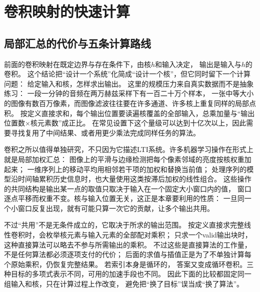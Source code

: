 \section{卷积映射的快速计算}
\label{sec:signal-analysis-fast-transforms}

\subsection{局部汇总的代价与五条计算路线}

前面的卷积映射在既定边界与存在条件下，由核$h$和输入决定，
输出是输入与$h$的卷积。
这个结论把“设计一个系统”化简成“设计一个核”，但它同时留下一个计算问题：
给定输入和核，怎样求出输出。
这里的规模压力来自真实数据而不是抽象练习：
一段一分钟的音频在两万赫兹采样下有一百二十万个样本，
一张中等大小的图像有数百万像素，而图像滤波往往要在许多通道、许多核上重复同样的局部点积。
按定义直接求和，每个输出位置要读遍核覆盖的全部输入，总乘加量与“输出位置数×核元素数”成正比。
在常见设置下这个量级可以达到十亿次以上，因此需要寻找复用了中间结果、或者用更少乘法完成同样任务的算法。

卷积之所以值得单独研究，不只因为它描述LTI系统。许多机器学习操作在形式上就是局部加权汇总：
图像上的平滑与边缘检测把每个像素邻域的亮度按核权重加起来；
一维序列上的移动平均用相邻若干项的加权和替换当前值；
处理序列的模型沿时间轴累积历史信息时，也大量使用这类按滞后加权的线性组合。
这些操作的共同结构是输出某一点的取值只取决于输入在一个固定大小窗口内的值，
窗口逐点平移而权重不变。核与输入位置无关，这正是本章要利用的性质：
一旦同一个小窗口反复出现，就有可能只算一次它的贡献，让多个输出共用。

不过“共用”不是无条件成立的，它取决于所求的输出范围。
按定义直接求完整线性卷积时，会枚举核元素与输入元素的全部配对乘积；
只求一个valid输出块时，这种直接算法可以略去不参与所需输出的乘积。
不过这些是直接算法的工作量，不是任何算法都必须逐项支付的代价；
后面的求值与插值正是为了不单独计算每个原始乘积，仍恢复完整结果。
若索引本身是循环的，
答案又变成循环卷积。三种目标的多项式表示不同，可用的加速手段也不同。
因此下面的比较都固定同一组输入和核，只在计算过程上作改变，
避免把“换了目标”误当成“换了算法”。

